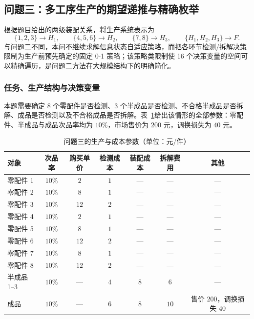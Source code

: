 \subsection{问题三：多工序生产的期望递推与精确枚举}

根据题目给出的两级装配关系，将生产系统表示为
\begin{equation}
  \{1,2,3\}\to H_1,\qquad
  \{4,5,6\}\to H_2,\qquad
  \{7,8\}\to H_3,\qquad
  \{H_1,H_2,H_3\}\to F.
  \label{eq:q3-structure}
\end{equation}
与问题二不同，本问不继续求解信息状态自适应策略，而把各环节检测/拆解决策限制为生产前预先确定的固定 0-1 策略；该策略类限制使 16 个决策变量的空间可以精确遍历，是问题二方法在大规模结构下的明确简化。

\subsubsection{任务、生产结构与决策变量}

本题需要确定 8 个零配件是否检测、3 个半成品是否检测、不合格半成品是否拆解、成品是否检测以及不合格成品是否拆解。表~\ref{tab:q3-params}给出该情形的全部参数：零配件、半成品与成品次品率均为 $10\%$，市场售价为 $200$ 元，调换损失为 $40$ 元。

\begin{table}[H]
  \centering
  \caption{问题三的生产与成本参数（单位：元/件）}
  \label{tab:q3-params}
  \small
  \begin{tabular}{lcccccc}
    \toprule
    对象 & 次品率 & 购买单价 & 检测成本 & 装配成本 & 拆解费用 & 其他 \\
    \midrule
    零配件 1 & $10\%$ & $2$ & $1$ & --- & --- & --- \\
    零配件 2 & $10\%$ & $8$ & $1$ & --- & --- & --- \\
    零配件 3 & $10\%$ & $12$ & $2$ & --- & --- & --- \\
    零配件 4 & $10\%$ & $2$ & $1$ & --- & --- & --- \\
    零配件 5 & $10\%$ & $8$ & $1$ & --- & --- & --- \\
    零配件 6 & $10\%$ & $12$ & $2$ & --- & --- & --- \\
    零配件 7 & $10\%$ & $8$ & $1$ & --- & --- & --- \\
    零配件 8 & $10\%$ & $12$ & $2$ & --- & --- & --- \\
    半成品 1--3 & $10\%$ & --- & $4$ & $8$ & $6$ & --- \\
    成品 & $10\%$ & --- & $6$ & $8$ & $10$ & 售价 $200$，调换损失 $40$ \\
    \bottomrule
  \end{tabular}
\end{table}

